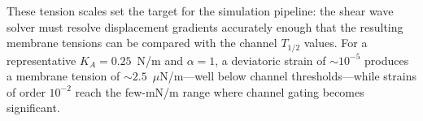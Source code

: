 \documentclass[11pt]{article}
\begin{document}
These tension scales set the target for the simulation pipeline: the shear wave
solver must resolve displacement gradients accurately enough that the resulting
membrane tensions can be compared with the channel $T_{1/2}$ values. For a
representative $K_A = 0.25$~N/m and $\alpha = 1$, a deviatoric strain of
${\sim}10^{-5}$ produces a membrane tension of ${\sim}2.5$~$\mu$N/m---well
below channel thresholds---while strains of order $10^{-2}$ reach the
few-mN/m range where channel gating becomes significant.




\end{document}
